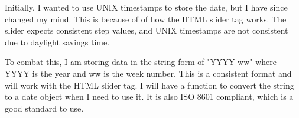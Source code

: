 \documentclass{report}
\begin{document}

\newpage

Initially, I wanted to use UNIX timestamps to store the date, but I have since changed my mind. This is because of of how the HTML slider tag works. The slider expects consistent step values, and UNIX timestamps are not consistent due to daylight savings time.

To combat this, I am storing data in the string form of "YYYY-ww" where YYYY is the year and ww is the week number. This is a consistent format and will work with the HTML slider tag. I will have a function to convert the string to a date object when I need to use it. It is also ISO 8601 compliant, which is a good standard to use.\\
\end{document}
